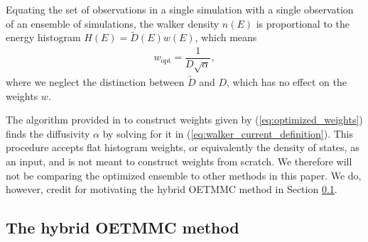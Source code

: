 \documentclass[11pt]{article}
\renewcommand{\t}{\text} %
\newcommand{\f}[2]{\dfrac{#1}{#2}} %
\newcommand{\p}[1]{\left(#1\right)} %
\begin{document}
Equating the set of observations in a single simulation with a single
observation of an ensemble of simulations, the walker density $n\p{E}$
is proportional to the energy histogram $H\p{E}=\tilde D\p{E}w\p{E}$,
which means
\begin{align}
  w_{\t{opt}}=\f1{D\sqrt{\alpha}},
  \label{eq:optimized_weights}
\end{align}
where we neglect the distinction between $\tilde D$ and $D$, which has
no effect on the weights $w$.

The algorithm provided in \cite{trebst2004optimizing} to construct
weights given by (\ref{eq:optimized_weights}) finds the diffusivity
$\alpha$ by solving for it in
(\ref{eq:walker_current_definition}). This procedure accepts flat
histogram weights, or equivalently the density of states, as an input,
and is not meant to construct weights from scratch. We therefore will
not be comparing the optimized ensemble to other methods in this
paper. We do, however, credit \cite{trebst2004optimizing} for
motivating the hybrid OETMMC method in Section \ref{sec:oetmmc}.

\subsection{The hybrid OETMMC method}
\label{sec:oetmmc}
\end{document}
